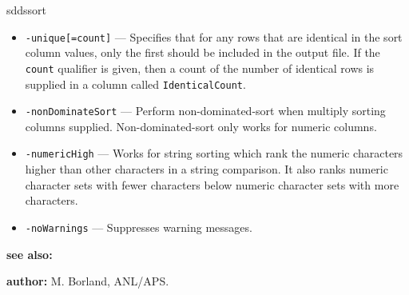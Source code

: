 \begin{sddsprog}{sddssort}
\begin{itemize}
      \item \verb|-unique[=count]| --- Specifies that for any rows that are identical in the sort column values, only the first should be included in the output file. If the \verb|count| qualifier is given, then a count of the number of identical rows is supplied in a column called \verb|IdenticalCount|.
      \item \verb|-nonDominateSort| --- Perform non-dominated-sort when multiply sorting columns supplied. Non-dominated-sort only works for numeric columns.
      \item \verb|-numericHigh| --- Works for string sorting which rank the numeric characters higher than other characters in a string comparison. It also ranks numeric character sets with fewer characters below numeric character sets with more characters.
      \item \verb|-noWarnings| --- Suppresses warning messages.
    \end{itemize}
  \item \textbf{see also:} 
  \item \textbf{author:} M. Borland, ANL/APS.
\end{sddsprog}

